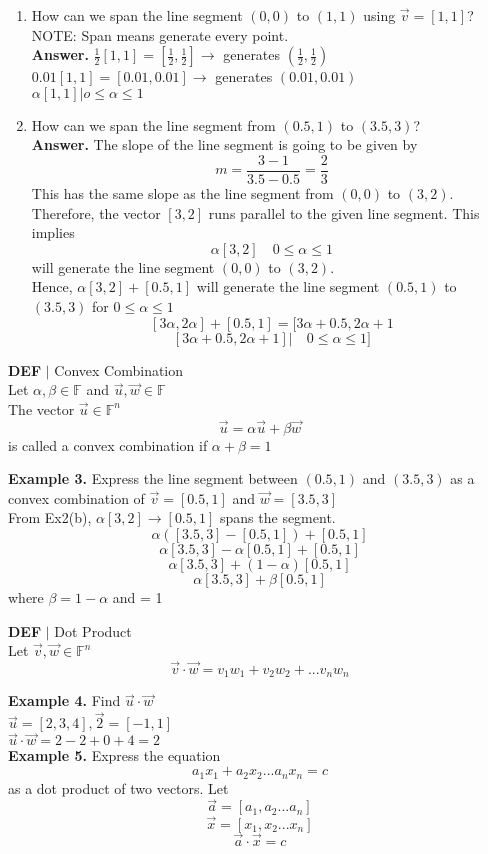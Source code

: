 \documentclass [12pt]{article}
\begin{document}
\begin{enumerate}[\quad(a)]
    \item How can we span the line segment $(0,0)$ to $(1,1)$ using $\overrightarrow{v}=[1,1]$? NOTE: Span means generate every point.\\
    \textbf{Answer. } $\frac{1}{2}[1,1] = [\frac{1}{2},\frac{1}{2}] \longrightarrow$ generates $(\frac{1}{2},\frac{1}{2})$\\
    $0.01[1,1] = [0.01,0.01] \longrightarrow$ generates $(0.01,0.01)$\\
    \quad${\alpha [1,1]|o\leq\alpha\leq1}$
    \item How can we span the line segment from $(0.5,1)$ to $(3.5,3)$?\\
    \textbf{Answer. } The slope of the line segment is going to be given by 
    \[m=\frac{3-1}{3.5-0.5}=\frac{2}{3}\]
    This has the same slope as the line segment from $(0,0)$ to $(3,2)$. Therefore, the vector $[3,2]$ runs parallel to the given line segment. This implies 
    \[\alpha [3,2]\quad 0\leq\alpha\leq1\]
    will generate the line segment $(0,0)$ to $(3,2)$.\\
    Hence, $\alpha[3,2]+[0.5,1]$ will generate the line segment $(0.5, 1)$ to $(3.5, 3)$ for $0\leq\alpha\leq1$
    \[[3\alpha,2\alpha]+[0.5,1]=[3\alpha+0.5,2\alpha+1\]
    \[{[3\alpha+0.5,2\alpha+1]|\quad0\leq\alpha\leq1]}\]
\end{enumerate}

\begin{framed}
\textbf{DEF} $|$ Convex Combination\\
Let $\alpha,\beta\in\mathbb{F}$ and $\overrightarrow{u},\overrightarrow{w}\in\mathbb{F}$\\
The vector $\overrightarrow{u}\in\mathbb{F}^n$
\[\overrightarrow{u}=\alpha\overrightarrow{u}+\beta\overrightarrow{w}\]
is called a convex combination if $\alpha+\beta=1$
\end{framed}
\textbf{Example 3. } Express the line segment between $(0.5,1)$ and $(3.5, 3)$ as a convex combination of $\overrightarrow{v}=[0.5,1]$ and $\overrightarrow{w}=[3.5,3]$\\
From Ex2(b), $\alpha[3,2]\longrightarrow[0.5, 1]$ spans the segment.
\[\alpha ([3.5,3]-[0.5,1])+[0.5,1]\]
\[\alpha[3.5,3]-\alpha[0.5,1]+[0.5,1]\]
\[\alpha[3.5,3]+(1-\alpha)[0.5,1]\]
\[\alpha[3.5,3] + \beta[0.5,1]\]
where $\beta=1-\alpha$ and = 1
\begin{framed}
\textbf{DEF} $|$ Dot Product\\
Let $\overrightarrow{v},\overrightarrow{w}\in\mathbb{F}^n$
\[\overrightarrow{v}\cdot\overrightarrow{w}=v_1w_1+v_2w_2+...v_nw_n\]
\end{framed}
\noindent\textbf{Example 4. } Find $\overrightarrow{u}\cdot\overrightarrow{w}$\\
\indent$\overrightarrow{u} = [2,3,4], \overrightarrow{2}=[-1,1]$\\
\quad$\overrightarrow{u}\cdot\overrightarrow{w} = 2 - 2 + 0 + 4 = 2$\\
\textbf{Example 5.} Express the equation 
\[a_1x_1+a_2x_2...a_nx_n=c\]
as a dot product of two vectors. 
Let \[\overrightarrow{a}=[a_1,a_2...a_n]\]
\[\overrightarrow{x}=[x_1,x_2...x_n]\]
\[\overrightarrow{a}\cdot\overrightarrow{x}=c\]
\end{document}
